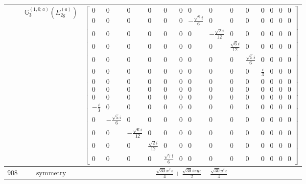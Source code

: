 \documentclass[fleqn,8pt,landscape]{jsarticle}
\begin{document}
\begin{longtable}{ccc}
$  $ & $ \mathbb{G}_{3}^{(1,0;a)}(E_{2g}^{(a)}) $ & $ \begin{bmatrix} 0 & 0 & 0 & 0 & 0 & 0 & 0 & 0 & 0 & 0 & 0 & 0 & 0 & 0 \\ 0 & 0 & 0 & 0 & 0 & 0 & - \frac{\sqrt{7} i}{6} & 0 & 0 & 0 & 0 & 0 & 0 & 0 \\ 0 & 0 & 0 & 0 & 0 & 0 & 0 & - \frac{\sqrt{2} i}{12} & 0 & 0 & 0 & 0 & 0 & 0 \\ 0 & 0 & 0 & 0 & 0 & 0 & 0 & 0 & \frac{\sqrt{6} i}{12} & 0 & 0 & 0 & 0 & 0 \\ 0 & 0 & 0 & 0 & 0 & 0 & 0 & 0 & 0 & \frac{\sqrt{5} i}{6} & 0 & 0 & 0 & 0 \\ 0 & 0 & 0 & 0 & 0 & 0 & 0 & 0 & 0 & 0 & \frac{i}{3} & 0 & 0 & 0 \\ 0 & 0 & 0 & 0 & 0 & 0 & 0 & 0 & 0 & 0 & 0 & 0 & 0 & 0 \\ 0 & 0 & 0 & 0 & 0 & 0 & 0 & 0 & 0 & 0 & 0 & 0 & 0 & 0 \\ 0 & 0 & 0 & 0 & 0 & 0 & 0 & 0 & 0 & 0 & 0 & 0 & 0 & 0 \\ - \frac{i}{3} & 0 & 0 & 0 & 0 & 0 & 0 & 0 & 0 & 0 & 0 & 0 & 0 & 0 \\ 0 & - \frac{\sqrt{5} i}{6} & 0 & 0 & 0 & 0 & 0 & 0 & 0 & 0 & 0 & 0 & 0 & 0 \\ 0 & 0 & - \frac{\sqrt{6} i}{12} & 0 & 0 & 0 & 0 & 0 & 0 & 0 & 0 & 0 & 0 & 0 \\ 0 & 0 & 0 & \frac{\sqrt{2} i}{12} & 0 & 0 & 0 & 0 & 0 & 0 & 0 & 0 & 0 & 0 \\ 0 & 0 & 0 & 0 & \frac{\sqrt{7} i}{6} & 0 & 0 & 0 & 0 & 0 & 0 & 0 & 0 & 0 \end{bmatrix} $ \\ \hline
$ 908 $ & $ \text{symmetry} $ & $ \frac{\sqrt{30} x^{2} z}{4} + \frac{\sqrt{30} i x y z}{2} - \frac{\sqrt{30} y^{2} z}{4} $ \\

\end{longtable}
\end{document}
